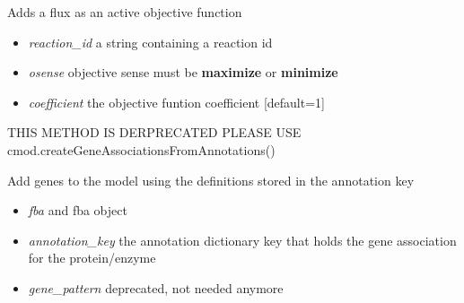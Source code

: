 \documentclass[a4paper,11pt,english]{sphinxmanual}
\begin{document}
\begin{fulllineitems}
\label{modules_doc:cbmpy.CBTools.addFluxAsActiveObjective}
Adds a flux as an active objective function
\begin{itemize}
\item {} 
\emph{reaction\_id} a string containing a reaction id

\item {} 
\emph{osense} objective sense must be \textbf{maximize} or \textbf{minimize}

\item {} 
\emph{coefficient} the objective funtion coefficient {[}default=1{]}

\end{itemize}

\end{fulllineitems}


\begin{fulllineitems}
\label{modules_doc:cbmpy.CBTools.addGenesFromAnnotations}
THIS METHOD IS DERPRECATED PLEASE USE cmod.createGeneAssociationsFromAnnotations()

Add genes to the model using the definitions stored in the annotation key
\begin{itemize}
\item {} 
\emph{fba} and fba object

\item {} 
\emph{annotation\_key} the annotation dictionary key that holds the gene association for the protein/enzyme

\item {} 
\emph{gene\_pattern} deprecated, not needed anymore

\end{itemize}

\end{fulllineitems}

\end{document}
